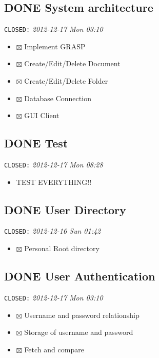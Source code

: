 \documentclass[11pt]{article}
\begin{document}
\subsection{\textbf{DONE} System architecture}
\label{sec-2-5}

   \texttt{CLOSED:} \textit{2012-12-17 Mon 03:10}

\begin{itemize}
\item $\boxtimes$ Implement GRASP
\item $\boxtimes$ Create/Edit/Delete Document
\item $\boxtimes$ Create/Edit/Delete Folder
\item $\boxtimes$ Database Connection
\item $\boxtimes$ GUI Client
\end{itemize}
\subsection{\textbf{DONE} Test}
\label{sec-2-6}

   \texttt{CLOSED:} \textit{2012-12-17 Mon 08:28}

\begin{itemize}
\item TEST EVERYTHING!!
\end{itemize}
\subsection{\textbf{DONE} User Directory}
\label{sec-2-7}

   \texttt{CLOSED:} \textit{2012-12-16 Sun 01:42}

\begin{itemize}
\item $\boxtimes$ Personal Root directory
\end{itemize}
\subsection{\textbf{DONE} User Authentication}
\label{sec-2-8}

   \texttt{CLOSED:} \textit{2012-12-17 Mon 03:10}

\begin{itemize}
\item $\boxtimes$ Username and password relationship
\item $\boxtimes$ Storage of username and password
\item $\boxtimes$ Fetch and compare
\end{itemize}
\end{document}
